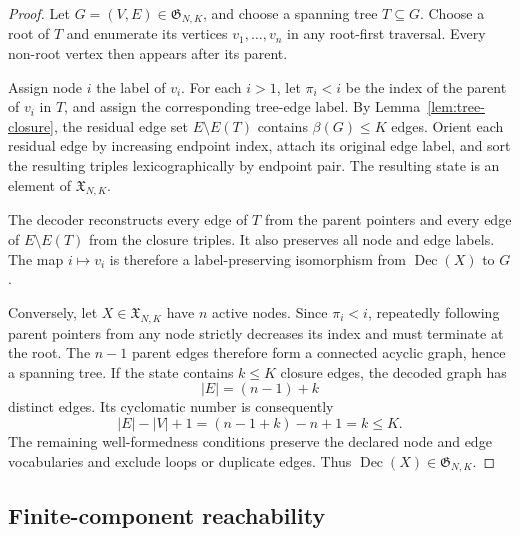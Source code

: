 \documentclass{article}
\begin{document}
\begin{proof}
Let $G=(V,E)\in\mathfrak{G}_{N,K}$, and choose a spanning tree $T\subseteq G$.
Choose a root of $T$ and enumerate its vertices $v_1,\ldots,v_n$ in any root-first traversal.
Every non-root vertex then appears after its parent.

Assign node $i$ the label of $v_i$.
For each $i>1$, let $\pi_i<i$ be the index of the parent of $v_i$ in $T$, and assign the
corresponding tree-edge label.
By Lemma~\ref{lem:tree-closure}, the residual edge set $E\setminus E(T)$ contains
$\beta(G)\leq K$ edges.
Orient each residual edge by increasing endpoint index, attach its original edge label, and sort the
resulting triples lexicographically by endpoint pair.
The resulting state is an element of $\mathfrak{X}_{N,K}$.

The decoder reconstructs every edge of $T$ from the parent pointers and every edge of
$E\setminus E(T)$ from the closure triples.
It also preserves all node and edge labels.
The map $i\mapsto v_i$ is therefore a label-preserving isomorphism from
$\operatorname{Dec}(X)$ to $G$.

Conversely, let $X\in\mathfrak{X}_{N,K}$ have $n$ active nodes.
Since $\pi_i<i$, repeatedly following parent pointers from any node strictly decreases its index and
must terminate at the root.
The $n-1$ parent edges therefore form a connected acyclic graph, hence a spanning tree.
If the state contains $k\leq K$ closure edges, the decoded graph has
\begin{equation}
    |E|=(n-1)+k
\end{equation}
distinct edges.
Its cyclomatic number is consequently
\begin{equation}
    |E|-|V|+1
    =
    (n-1+k)-n+1
    =
    k
    \leq K.
\end{equation}
The remaining well-formedness conditions preserve the declared node and edge vocabularies and
exclude loops or duplicate edges.
Thus $\operatorname{Dec}(X)\in\mathfrak{G}_{N,K}$.
\end{proof}

\subsection{Finite-component reachability}
\end{document}
